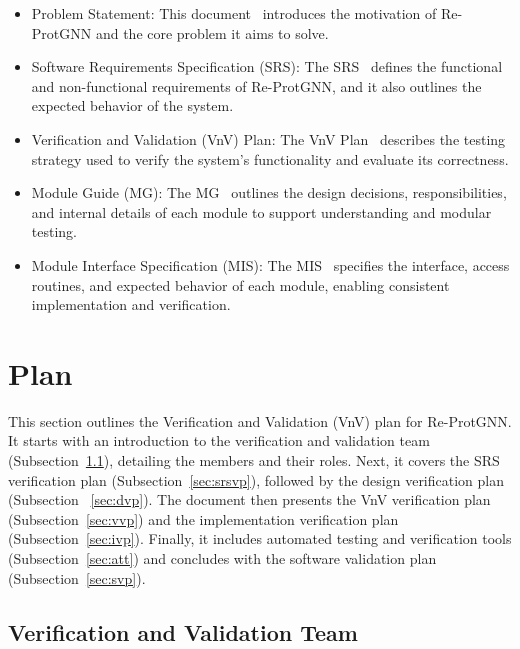 \documentclass[12pt, titlepage]{article}
\begin{document}
\begin{itemize}
    \item Problem Statement: This document~\citep{yuanqi2025protgnn} introduces the motivation of Re-ProtGNN and the core problem it aims to solve.
    
    \item Software Requirements Specification (SRS): The SRS~\citep{Yuanqi_ReProtGNN_SRS} defines the functional and non-functional requirements of Re-ProtGNN, and it also outlines the expected behavior of the system.
    
    \item Verification and Validation (VnV) Plan: The VnV Plan~\citep{Yuanqi_ReProtGNN_VnV} describes the testing strategy used to verify the system’s functionality and evaluate its correctness.
    
    \item Module Guide (MG): The MG~\citep{Yuanqi_ReProtGNN_MG} outlines the design decisions, responsibilities, and internal details of each module to support understanding and modular testing.
    
    \item Module Interface Specification (MIS): The MIS~\citep{Yuanqi_ReProtGNN_MIS} specifies the interface, access routines, and expected behavior of each module, enabling consistent implementation and verification.
\end{itemize}


\section{Plan}

This section outlines the Verification and Validation (VnV) plan for Re-ProtGNN. It starts with an introduction to the verification and validation team (Subsection~\ref{sec:vvt}), detailing the members and their roles. Next, it covers the SRS verification plan (Subsection~\ref{sec:srsvp}), followed by the design verification plan (Subsection ~\ref{sec:dvp}). The document then presents the VnV verification plan (Subsection~\ref{sec:vvp}) and the implementation verification plan (Subsection~\ref{sec:ivp}). Finally, it includes automated testing and verification tools (Subsection~\ref{sec:att}) and concludes with the software validation plan (Subsection~\ref{sec:svp}).

\subsection{Verification and Validation Team}
\label{sec:vvt}
\end{document}
